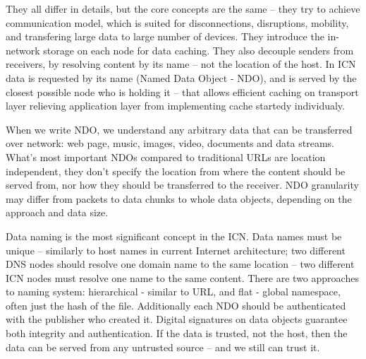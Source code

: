 \documentclass[nostrict]{szablonPG}
\begin{document}
They all differ in details, but the core concepts are the same -- they try to achieve communication model, which is suited for disconnections, disruptions, mobility, and transfering large data to large number of devices. They introduce the in-network storage on each node for data caching. They also decouple senders from receivers, by resolving content by its name -- not the location of the host. 
In ICN data is requested by its name (Named Data Object - NDO), and is served by the closest possible node who is holding it -- that allows efficient caching on transport layer relieving application layer from implementing cache startedy individualy. 

When we write NDO, we understand any arbitrary data that can be transferred over network: web page, music, images, video, documents and data streams. What's most important NDOs compared to traditional URLs are location independent, they don't specify the location from where the content should be served from, nor how they should be transferred to the receiver. NDO granularity may differ from packets to data chunks to whole data objects, depending on the approach and data size.

Data naming is the most significant concept in the ICN. Data names must be unique -- similarly to host names in current Internet architecture; two different DNS nodes should resolve one domain name to the same location -- two different ICN nodes must resolve one name to the same content. 
There are two approaches to naming system: hierarchical - similar to URL, and flat - global namespace, often just the hash of the file.
Additionally each NDO should be authenticated with the publisher who created it. Digital signatures on data objects guarantee both integrity and authentication. If the data is trusted, not the host, then the data can be served from any untrusted source -- and we still can trust it.
\end{document}
